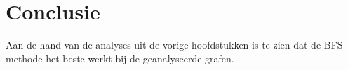 \chapter{Conclusie}
\label{chap:conclusion}

Aan de hand van de analyses uit de vorige hoofdstukken is te zien dat de BFS methode het beste werkt bij de geanalyseerde grafen. 